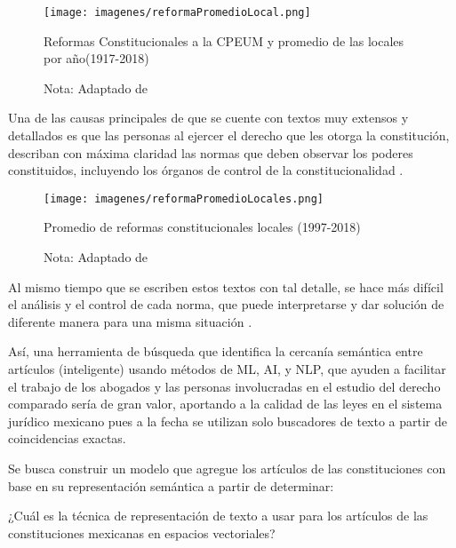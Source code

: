 \documentclass[12pt]{article}
\begin{document}
		\begin{figure}[H]
		\texttt{[image: imagenes/reformaPromedioLocal.png]}
		\centering
		\caption{Reformas Constitucionales a la CPEUM y promedio de las locales por año(1917-2018)}
		\caption*{\small Nota: Adaptado de \cite{Gallardo2020}}
		\label{fig:promedioLocalXaño}
		\end{figure}
		
		
		Una de las causas principales de que se cuente con textos muy extensos y detallados es que 
		las personas al ejercer el derecho que les otorga la constitución, describan con máxima  claridad las normas que deben observar los poderes constituidos, incluyendo los órganos de control de la constitucionalidad \cite{Fix-Fierro2017}.
		
		\begin{figure}[H]
			\texttt{[image: imagenes/reformaPromedioLocales.png]}
			\centering
			\caption{Promedio de reformas constitucionales locales (1997-2018)}
			\caption*{\small Nota: Adaptado de  \cite{Gallardo2020}}
			\label{fig:promedioLocal}
		\end{figure}
		
		
		
		Al mismo tiempo que se escriben estos textos con tal detalle, se hace más difícil el análisis y el control de cada norma, que puede interpretarse y dar solución de diferente manera para una misma situación \cite{Risco2017}.
		
		Así, una herramienta de búsqueda que identifica la cercanía semántica entre artículos (inteligente) usando métodos de ML, AI, y NLP, que ayuden a facilitar el trabajo de los abogados y las personas involucradas en el estudio del derecho comparado sería de gran valor, aportando a la calidad de las leyes en el sistema jurídico mexicano pues a la fecha se utilizan solo buscadores de texto a partir de coincidencias exactas.
		
		Se busca construir un modelo que agregue los artículos de las constituciones con base en su representación semántica a partir de determinar:
		
		¿Cuál es la técnica de representación de texto a usar para los artículos de las constituciones mexicanas en espacios vectoriales?
		
\end{document}
